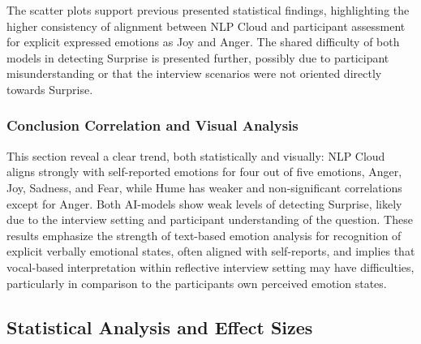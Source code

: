 The scatter plots support previous presented statistical findings, highlighting the higher consistency of alignment between NLP Cloud and participant assessment for explicit expressed emotions as Joy and Anger. 
The shared difficulty of both models in detecting Surprise is presented further, possibly due to participant misunderstanding or that the interview scenarios were not oriented directly towards Surprise. 

\subsubsection{Conclusion Correlation and Visual Analysis}
This section reveal a clear trend, both statistically and visually: NLP Cloud aligns strongly with self-reported emotions for four out of five emotions, Anger, Joy, Sadness, and Fear, while Hume has weaker and 
non-significant correlations except for Anger. Both AI-models show weak levels of detecting Surprise, likely due to the interview setting and participant understanding of the question. 
These results emphasize the strength of text-based emotion analysis for recognition of explicit verbally emotional states, often aligned with self-reports, and 
implies that vocal-based interpretation within reflective interview setting may have difficulties, particularly in comparison to the participants own perceived emotion states. 

\subsection{Statistical Analysis and Effect Sizes}

